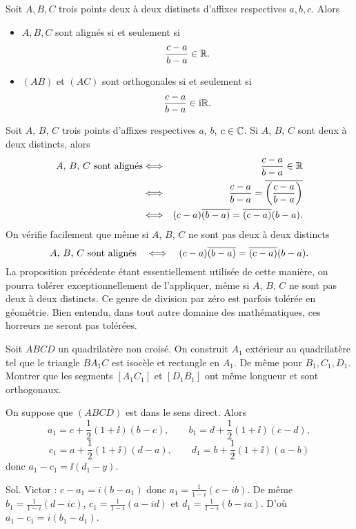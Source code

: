\documentclass{magnoliaold}
\begin{document}
\begin{proposition}[utile=-3]
Soit $A,B,C$ trois points deux à deux distincts d'affixes respectives $a,b,c$. Alors
\begin{itemize}
\item $A,B,C$ sont alignés si et seulement si
  \[\frac{c-a}{b-a}\in\mathbb{R}.\]
\item $(AB)$ et $(AC)$ sont orthogonales si et seulement si
  \[\frac{c-a}{b-a}\in{\rm i}\mathbb{R}.\]
\end{itemize}
\end{proposition}

\begin{remarques}
\remarque Soit $A$, $B$, $C$ trois points d'affixes respectives $a$, $b$, $c\in\mathbb{C}$. Si $A$, $B$, $C$ sont deux à deux distincts, alors
  \begin{eqnarray*}
  \text{$A$, $B$, $C$ sont alignés}
  &\Longleftrightarrow& \frac{c-a}{b-a}\in\mathbb{R}\\
  &\Longleftrightarrow& \frac{c-a}{b-a}=\overline{\left(\frac{c-a}{b-a}\right)}\\
  &\Longleftrightarrow& (c-a)\overline{(b-a)}=\overline{(c-a)}(b-a).
  \end{eqnarray*}
  On vérifie facilement que même si $A$, $B$, $C$ ne sont pas deux à deux distincts
  \[\text{$A$, $B$, $C$ sont alignés} \quad\Longleftrightarrow\quad (c-a)\overline{(b-a)}=\overline{(c-a)}(b-a).\]
\remarque La proposition précédente étant essentiellement utilisée de cette manière, on pourra tolérer exceptionnellement de l'appliquer, même si $A$, $B$, $C$ ne sont pas deux à deux distincts. Ce genre de \og division par zéro \fg est parfois tolérée en géométrie. Bien entendu, dans tout autre domaine des mathématiques, ces horreurs ne seront pas tolérées.
\end{remarques}

\begin{exoUnique}
\exo Soit $ABCD$ un quadrilatère non croisé. On construit $A_1$ extérieur
au quadrilatère tel que le triangle $BA_1C$ est isocèle et
rectangle en $A_1$. De même pour $B_1,C_1,D_1$. Montrer que les
segments $[A_1C_1]$ et $[D_1B_1]$ ont même longueur et sont
orthogonaux.
\begin{sol}
On suppose que $(ABCD)$ est dans le sens direct. Alors
\[a_1=c+\frac{1}{2}(1+\ii)(b-c), \qquad
  b_1=d+\frac{1}{2}(1+\ii)(c-d),\]
\[c_1=a+\frac{1}{2}(1+\ii)(d-a), \qquad
  d_1=b+\frac{1}{2}(1+\ii)(a-b)\]
donc $a_1-c_1=\ii(d_1-y)$.

Sol. Victor :
$c-a_1=i(b-a_1)$ donc $a_1=\frac{1}{1-i}(c-ib)$. De même $b_1=\frac{1}{1-i}(d-ic)$, $c_1=\frac{1}{1-i}(a-id)$ et $d_1=\frac{1}{1-i}(b-ia)$. D'où $a_1-c_1=i(b_1-d_1)$.
\end{sol}
\end{exoUnique}
\end{document}
